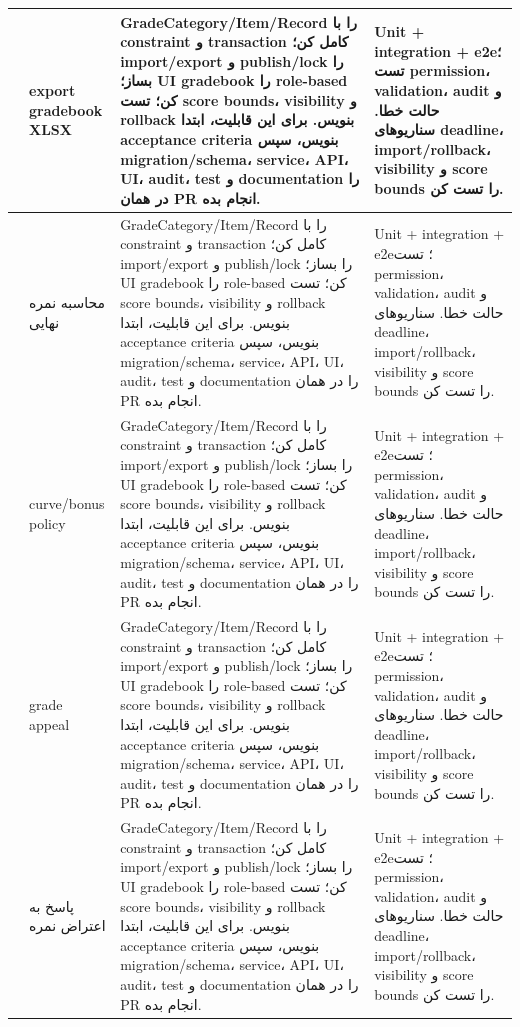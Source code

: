 \documentclass[11pt,a4paper]{article}
\begin{document}
\begin{longtable}{|>{\raggedleft\arraybackslash}p{}|>{\raggedleft\arraybackslash}p{}|>{\raggedleft\arraybackslash}p{}|>{\raggedleft\arraybackslash}p{}|}
135 & export gradebook XLSX & GradeCategory/Item/Record را با constraint و transaction کامل کن؛ import/export و publish/lock را بساز؛ UI gradebook را role-based کن؛ تست score bounds، visibility و rollback بنویس. برای این قابلیت، ابتدا acceptance criteria بنویس، سپس migration/schema، service، API، UI، audit، test و documentation را در همان PR انجام بده. & Unit + integration + e2e؛ تست permission، validation، audit و حالت خطا. سناریوهای deadline، import/rollback، visibility و score bounds را تست کن. \\ \hline
136 & محاسبه نمره نهایی & GradeCategory/Item/Record را با constraint و transaction کامل کن؛ import/export و publish/lock را بساز؛ UI gradebook را role-based کن؛ تست score bounds، visibility و rollback بنویس. برای این قابلیت، ابتدا acceptance criteria بنویس، سپس migration/schema، service، API، UI، audit، test و documentation را در همان PR انجام بده. & Unit + integration + e2e؛ تست permission، validation، audit و حالت خطا. سناریوهای deadline، import/rollback، visibility و score bounds را تست کن. \\ \hline
137 & curve/bonus policy & GradeCategory/Item/Record را با constraint و transaction کامل کن؛ import/export و publish/lock را بساز؛ UI gradebook را role-based کن؛ تست score bounds، visibility و rollback بنویس. برای این قابلیت، ابتدا acceptance criteria بنویس، سپس migration/schema، service، API، UI، audit، test و documentation را در همان PR انجام بده. & Unit + integration + e2e؛ تست permission، validation، audit و حالت خطا. سناریوهای deadline، import/rollback، visibility و score bounds را تست کن. \\ \hline
138 & grade appeal & GradeCategory/Item/Record را با constraint و transaction کامل کن؛ import/export و publish/lock را بساز؛ UI gradebook را role-based کن؛ تست score bounds، visibility و rollback بنویس. برای این قابلیت، ابتدا acceptance criteria بنویس، سپس migration/schema، service، API، UI، audit، test و documentation را در همان PR انجام بده. & Unit + integration + e2e؛ تست permission، validation، audit و حالت خطا. سناریوهای deadline، import/rollback، visibility و score bounds را تست کن. \\ \hline
139 & پاسخ به اعتراض نمره & GradeCategory/Item/Record را با constraint و transaction کامل کن؛ import/export و publish/lock را بساز؛ UI gradebook را role-based کن؛ تست score bounds، visibility و rollback بنویس. برای این قابلیت، ابتدا acceptance criteria بنویس، سپس migration/schema، service، API، UI، audit، test و documentation را در همان PR انجام بده. & Unit + integration + e2e؛ تست permission، validation، audit و حالت خطا. سناریوهای deadline، import/rollback، visibility و score bounds را تست کن. \\ \hline

\end{longtable}
\end{document}
